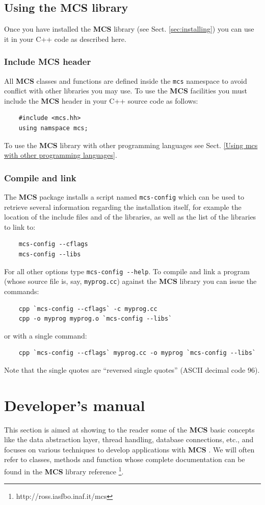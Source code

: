 \documentclass[12pt,titlepage]{article}
\newcommand{\mcs}{\textbf{MCS} }
\def\url{http://ross.iasfbo.inaf.it/mcs}
\begin{document}
%
\subsection{Using the \mcs library}
Once you have installed the \mcs library (see Sect. \ref{sec:installing}) you
can use it in your C++ code as described here.

\subsubsection{Include \mcs header}
All \mcs classes and functions are defined inside the \verb|mcs| namespace to
avoid conflict with other libraries you may use. To use the \mcs facilities
you must include the \mcs header in your C++ source code as follows:
%
\begin{verbatim}
    #include <mcs.hh>
    using namspace mcs;
\end{verbatim}
%
To use the \mcs library with other programming languages see Sect. \ref{Using
  mcs with other programming languages}.

%
\subsubsection{Compile and link}
The \mcs package installs a script named \verb|mcs-config| which can be
used to retrieve several information regarding the installation
itself, for example the location of the include files and of the
libraries, as well as the list of the libraries to link to:
%
\begin{verbatim}
    mcs-config --cflags
    mcs-config --libs
\end{verbatim}
%
For all other options type \verb|mcs-config --help|. To compile and
link a program (whose source file is, say, \verb|myprog.cc|) against
the \mcs library you can issue the commands:
%
\begin{verbatim}
    cpp `mcs-config --cflags` -c myprog.cc
    cpp -o myprog myprog.o `mcs-config --libs`
\end{verbatim}
%
or with a single command:
%
\begin{verbatim}
    cpp `mcs-config --cflags` myprog.cc -o myprog `mcs-config --libs`
\end{verbatim}
%
Note that the single quotes are ``reversed single quotes'' (ASCII
decimal code 96).


%
\newpage
\section{Developer's manual}
This section is aimed at showing to the reader some of the \mcs
basic concepts like the data abstraction layer, thread
handling, database connections, etc., and focuses on various
techniques to develop applications with \mcs. We will often refer to
classes, methods and function whose complete documentation can be
found in the \mcs library reference \footnote{\textsf{\url}}.
\end{document}
